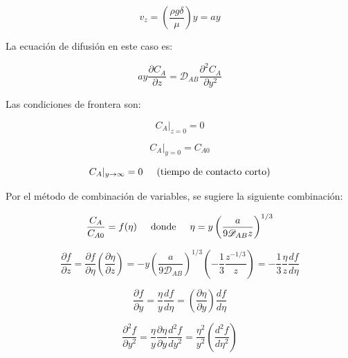 \begin{equation}
	v_z = \left( \frac{\rho g \delta}{\mu} \right) y = ay
\end{equation}

La ecuación de difusión en este caso es:

\begin{equation} \label{eq: manrefx10.1}
	ay \frac{\partial C_A}{\partial z} = \mathscr{D}_{AB} \frac{\partial^2 C_A}{\partial y^2}
\end{equation}

Las condiciones de frontera son:

\begin{equation}
	C_A|_{z=0} = 0
\end{equation}

\begin{equation}
	C_A|_{y=0} = C_{A0}
\end{equation}

\begin{equation}
	C_A|_{y \to \infty} = 0 \hspace{0.5cm} \text{(tiempo de contacto corto)}
\end{equation}

Por el método de combinación de variables, se sugiere la siguiente combinación:

\begin{equation} \label{eq: manrefx11}
	\frac{C_A}{C_{A0}} = f(\eta) \hspace{0.5cm} \text{donde} \hspace{0.5cm} \eta = y \left( \frac{a}{9 \mathscr{D}_{AB}z} \right)^{1/3}
\end{equation}

\begin{equation}
	\frac{\partial f}{\partial z} = \frac{\partial f}{\partial \eta} \left( \frac{\partial \eta}{\partial z} \right) = - y \left( \frac{a}{9 \mathscr{D}_{AB}} \right)^{1/3} \left( - \frac{1}{3} \frac{z^{-1/3}}{z} \right) = - \frac{1}{3} \frac{\eta}{z} \frac{d f}{d \eta}
\end{equation}

$$
\frac{\partial f}{\partial y} = \frac{\eta}{y} \frac{df}{d\eta} = \left( \frac{\partial \eta}{\partial y} \right) \frac{d f}{d \eta}
$$

\begin{equation} \label{eq: manrefx12}
	\frac{\partial^2 f}{\partial y^2} = \frac{\eta}{y} \frac{\partial \eta}{\partial y} \frac{d^2 f}{d y^2} = \frac{\eta^2}{y^2} \left( \frac{d^2 f}{d \eta^2} \right)
\end{equation}

